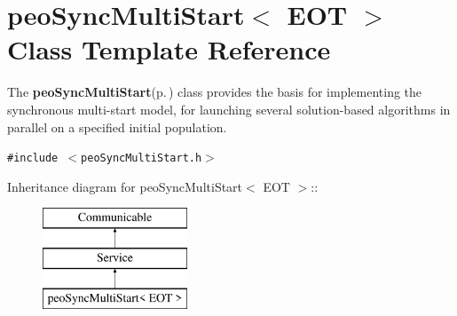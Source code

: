 \section{peo\-Sync\-Multi\-Start$<$ EOT $>$ Class Template Reference}
\label{classpeo_sync_multi_start}
The {\bf peo\-Sync\-Multi\-Start}{\rm (p.\,\pageref{classpeo_sync_multi_start})} class provides the basis for implementing the synchronous multi-start model, for launching several solution-based algorithms in parallel on a specified initial population.  


{\tt \#include $<$peo\-Sync\-Multi\-Start.h$>$}

Inheritance diagram for peo\-Sync\-Multi\-Start$<$ EOT $>$::\begin{figure}[H]
\begin{center}
\leavevmode
\includegraphics[height=3cm]{classpeo_sync_multi_start}
\end{center}
\end{figure}
